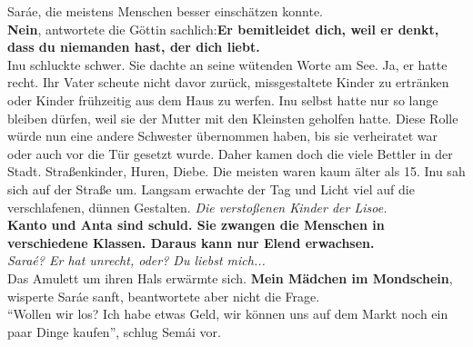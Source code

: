 Saráe, die meistens Menschen besser einschätzen konnte.\\
\textbf{Nein}, antwortete die Göttin sachlich:\textbf{Er bemitleidet dich, weil er denkt, dass du 
niemanden hast, der dich liebt.}\\
Inu schluckte schwer. Sie dachte an seine wütenden Worte am See. Ja, er hatte recht. Ihr Vater 
scheute nicht davor zurück, missgestaltete Kinder zu ertränken oder Kinder frühzeitig aus dem Haus 
zu werfen. Inu selbst hatte nur so lange bleiben dürfen, weil sie der Mutter mit den Kleinsten 
geholfen hatte. Diese Rolle würde nun eine andere Schwester übernommen haben, bis sie verheiratet 
war oder auch vor die Tür gesetzt wurde. Daher kamen doch die viele Bettler in der Stadt. 
Straßenkinder, Huren, Diebe. Die meisten waren kaum älter als 15. Inu sah sich auf der Straße um. 
Langsam erwachte der Tag und Licht viel auf die verschlafenen, dünnen Gestalten. \textit{Die 
verstoßenen Kinder der Lisoe.}\\
\textbf{Kanto und Anta sind schuld. Sie zwangen die Menschen in verschiedene Klassen. Daraus kann 
nur Elend erwachsen.}\\
\textit{Saraé? Er hat unrecht, oder? Du liebst mich...}\\
Das Amulett um ihren Hals erwärmte sich. \textbf{Mein Mädchen im Mondschein}, wisperte Saráe sanft, 
beantwortete aber nicht die Frage.\\
``Wollen wir los? Ich habe etwas Geld, wir können uns auf dem Markt noch ein paar Dinge kaufen'', 
schlug Semái vor.\\

